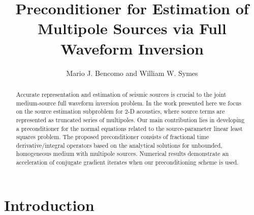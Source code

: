 \newcommand{\Langle}{\bigg\langle} 
\newcommand{\Rangle}{\bigg\rangle} 
\newcommand{\Lparan}{\bigg(} 
\newcommand{\Rparan}{\bigg)} 
\newcommand{\WE}{\Lparan\frac{\partial^2}{\partial t^2} - c^2\nabla^2 \Rparan} 
\def\mathbi#1{\textbf{\em{#1}}}
\def\bhat#1{\hat{\mathbf{#1}}}



\title{Preconditioner for Estimation of Multipole Sources via Full Waveform Inversion}
\date{}



\author{Mario J. Bencomo and William W. Symes}


\maketitle
\parskip 12pt

\begin{abstract}


Accurate representation and estimation of seismic sources is crucial to the joint medium-source full waveform inversion problem. 
In the work presented here we focus on the source estimation subproblem for 2-D acoustics, where source terms are represented as truncated series of multipoles. 
Our main contribution lies in developing a preconditioner for the normal equations related to the source-parameter linear least squares problem.
The proposed preconditioner consists of fractional time derivative/integral operators based on the analytical solutions for unbounded, homogeneous medium with multipole sources.  
Numerical results demonstrate an acceleration of conjugate gradient iterates when our preconditioning scheme is used.

\end{abstract}

\section{Introduction}

